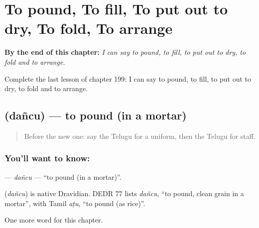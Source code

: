 
\chapter{To pound, To fill, To put out to dry, To fold, To arrange}
\label{ch:te-to-pound-to-fill-to-put-out-to-dry-to-fold-to-arrange}

\begin{chapteropening}
\textbf{By the end of this chapter:} \emph{I can say to pound, to fill, to put out to dry, to fold and to arrange.}

Complete the last lesson of chapter 199: I can say to pound, to fill, to put out to dry, to fold and to arrange.
\end{chapteropening}

\section[\texorpdfstring{\te{దంచు} (dañcu)}{దంచు (dañcu)}]{ (dañcu) — to pound (in a mortar)}

\label{lesson:TE-C199-dancu}



\begin{quote}
Before the new one: say the Telugu for a uniform, then the Telugu for staff.
\end{quote}

\subsection*{You'll want to know: }
\textbf{} — \emph{dañcu} — \textquotedblleft{}to pound (in a mortar)\textquotedblright{}.

\begin{cousinweb}
\textbf{} (\emph{dañcu}) is native Dravidian. DEDR 77 lists \emph{dañcu}, \textquotedblleft{}to pound, clean grain in a mortar\textquotedblright{}, with Tamil \emph{aṭu}, \textquotedblleft{}to pound (as rice)\textquotedblright{}.
\end{cousinweb}

\begin{grammarlens}[title={What you've built}]
One more word for this chapter.
\end{grammarlens}

